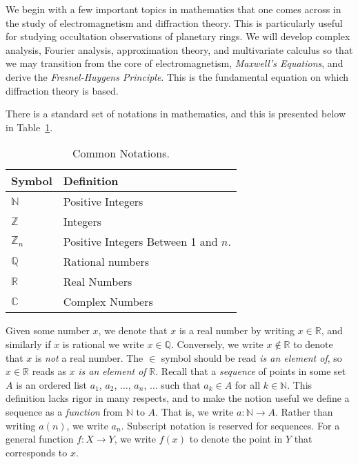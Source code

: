 We begin with a few important topics in mathematics that one comes
across in the study of electromagnetism and diffraction theory.
This is particularly useful for studying occultation observations
of planetary rings. We will develop complex analysis, Fourier analysis,
approximation theory, and multivariate calculus so that we may
transition from the core of electromagnetism, \textit{Maxwell's Equations},
and derive the \textit{Fresnel-Huygens Principle}. This is the fundamental
equation on which diffraction theory is based.
\par\hfill\par
There is a standard set of notations in mathematics, and this is
presented below in Table~\ref{tab:Common_Notations}.
\begin{table}[H]
    \centering
    \captionsetup{type=table}
    \begin{tabular}{|l|l|}
        \hline
        Symbol&Definition\\
        \hline
        $\mathbb{N}$&Positive Integers\\
        \hline
        $\mathbb{Z}$&Integers\\
        \hline
        $\mathbb{Z}_{n}$&Positive Integers Between 1 and $n$.\\
        \hline
        $\mathbb{Q}$&Rational numbers\\
        \hline
        $\mathbb{R}$&Real Numbers\\
        \hline
        $\mathbb{C}$&Complex Numbers\\
        \hline
    \end{tabular}
    \caption{Common Notations.}
    \label{tab:Common_Notations}
\end{table}
Given some number $x$, we denote that $x$ is a real number by writing
$x\in\mathbb{R}$, and similarly if $x$ is rational we write
$x\in\mathbb{Q}$. Conversely, we write $x\notin\mathbb{R}$ to denote that
$x$ is \textit{not} a real number. The $\in$ symbol should be read
\textit{is an element of}, so $x\in\mathbb{R}$ reads as $x$
\textit{is an element of} $\mathbb{R}$. Recall that a
\textit{sequence} of points in some set $A$ is an ordered list
$a_{1}$, $a_{2}$, $\dots$, $a_{n}$, $\dots$ such that $a_{k}\in{A}$
for all $k\in\mathbb{N}$. This definition lacks rigor in many
respects, and to make the notion useful we define a sequence as
a \textit{function} from $\mathbb{N}$ to $A$. That is, we write
$a:\mathbb{N}\rightarrow{A}$. Rather than writing $a(n)$, we write
$a_{n}$. Subscript notation is reserved for sequences. For a
general function $f:X\rightarrow{Y}$, we
write $f(x)$ to denote the point in $Y$ that corresponds to $x$.




